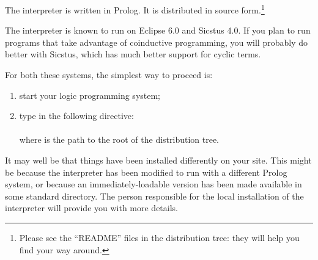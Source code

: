 
The interpreter is written in Prolog.  It is distributed in source
form.\footnote{%
  Please see the ``README'' files in the distribution tree: they will help you
  find your way around.}

The interpreter is known to run on Eclipse 6.0 and Sicstus 4.0.  If you plan
to run programs that take advantage of coinductive programming, you will
probably do better with Sicstus, which has much better support for cyclic
terms.

For both these systems, the simplest way to proceed is:
\begin{enumerate}
\item start your logic programming system;
\item type in the following directive:\\
  \ind\prog{:-~[~'}\prog{/tabling/dra'~]}\\
  where  is the path to the root of the distribution tree.
\end{enumerate}

It may well be that things have been installed differently on your site.
This might be because the interpreter has been modified to run with a
different Prolog system, or because an immediately-loadable version has been
made available in some standard directory. The person responsible for the
local installation of the interpreter will provide you with more details.
